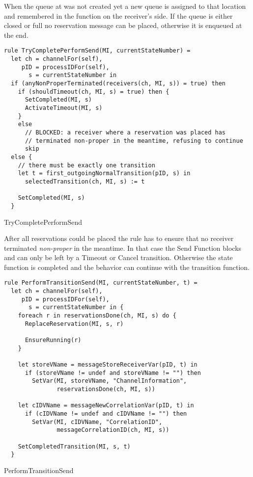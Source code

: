 When the queue at  was not
created yet a new queue is assigned to that location and remembered in the
 function on the receiver's side.
If the queue is either closed or full no reservation message can be placed,
otherwise it is enqueued at the end.



\begin{listing}[H]
\begin{verbatim}
rule TryCompletePerformSend(MI, currentStateNumber) =
  let ch = channelFor(self),
     pID = processIDFor(self),
       s = currentStateNumber in
  if (anyNonProperTerminated(receivers(ch, MI, s)) = true) then
    if (shouldTimeout(ch, MI, s) = true) then {
      SetCompleted(MI, s)
      ActivateTimeout(MI, s)
    }
    else
      // BLOCKED: a receiver where a reservation was placed has
      // terminated non-proper in the meantime, refusing to continue
      skip
  else {
    // there must be exactly one transition
    let t = first_outgoingNormalTransition(pID, s) in
      selectedTransition(ch, MI, s) := t

    SetCompleted(MI, s)
  }
\end{verbatim}
\caption{TryCompletePerformSend}
\label{lst:shortasm:TryCompletePerformSend}
\end{listing}


After all reservations could be placed the 
rule has to ensure that no receiver terminated \textit{non-proper} in the
meantime. In that case the Send Function blocks and can only be left by a
Timeout or Cancel transition. Otherwise the state function is completed and the behavior can
continue with the transition function.


\begin{listing}[H]
\begin{verbatim}
rule PerformTransitionSend(MI, currentStateNumber, t) =
  let ch = channelFor(self),
     pID = processIDFor(self),
       s = currentStateNumber in {
    foreach r in reservationsDone(ch, MI, s) do {
      ReplaceReservation(MI, s, r)

      EnsureRunning(r)
    }

    let storeVName = messageStoreReceiverVar(pID, t) in
      if (storeVName != undef and storeVName != "") then
        SetVar(MI, storeVName, "ChannelInformation",
               reservationsDone(ch, MI, s))

    let cIDVName = messageNewCorrelationVar(pID, t) in
      if (cIDVName != undef and cIDVName != "") then
        SetVar(MI, cIDVName, "CorrelationID",
               messageCorrelationID(ch, MI, s))

    SetCompletedTransition(MI, s, t)
  }
\end{verbatim}
\caption{PerformTransitionSend}
\label{lst:shortasm:PerformTransitionSend}
\end{listing}


